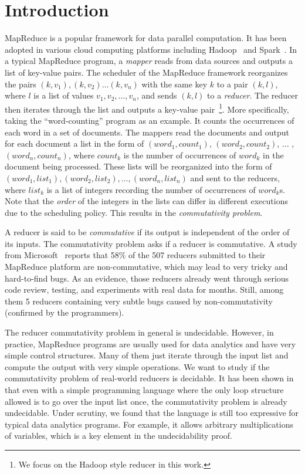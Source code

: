 
\section{Introduction}
MapReduce is a  popular framework for data parallel computation. It has been adopted in various cloud computing platforms including Hadoop~\cite{Hadoop} and Spark~\cite{Spark}. In a typical MapReduce program, a \emph{mapper} reads from data sources and outputs a list of key-value pairs. 
The scheduler of the MapReduce framework reorganizes the pairs $(k, v_1), (k,v_2)\ldots(k,v_n)$ with the same key $k$ to a pair $(k,l)$, where $l$ is a list of values $v_1,v_2,\ldots,v_n$, and sends $(k,l)$ to a \emph{reducer}. The reducer then iterates through the list and outputs a key-value pair~\footnote{We focus on the Hadoop style reducer in this work.}.
More specifically, taking the ``word-counting'' program as an example. It counts the occurrences of each word in a set of documents. The mappers read the documents and output for each document a list in the form of $(word_1, count_1)$, $(word_2, count_2)$, $\ldots$ , $(word_n, count_n)$, where $count_k$ is the number of occurrences of $word_k$ in the document being processed. These lists will be reorganized into the form of $(word_1, list_1), (word_2,list_2), \ldots, (word_n,list_n)$ and sent to the reducers, where $list_k$ is a list of integers recording the number of occurrences of $word_k$s. Note that the \emph{order} of the integers in the lists can differ in different executions due to the scheduling policy. This results in the \emph{commutativity problem}.

A reducer is said to be \emph{commutative} if its output is independent of the order of its inputs. The commutativity problem asks if a reducer is commutative. A study from Microsoft~\cite{XZZ+14} reports that 58\% of the 507 reducers submitted to their MapReduce platform are non-commutative, which may lead to very tricky and hard-to-find bugs.
As an evidence, those reducers already went through serious code review, testing, and experiments with real data for months. Still, among them 5 reducers containing very subtle bugs caused by non-commutativity (confirmed by the programmers). 

The reducer commutativity problem in general is undecidable. However, in practice, MapReduce programs are usually used for data analytics and have very simple control structures. Many of them just iterate through the input list and compute the output with very simple operations. We want to study if the commutativity problem of real-world reducers is decidable. It has been shown in~\cite{CHSW15} that even with a simple programming language where the only loop structure allowed is to go over the input list once, the commutativity problem is already undecidable. Under scrutiny, we found that the language is still too expressive for typical data analytics programs. For example, it allows arbitrary multiplications of variables, which is a key element in the undecidability proof.

